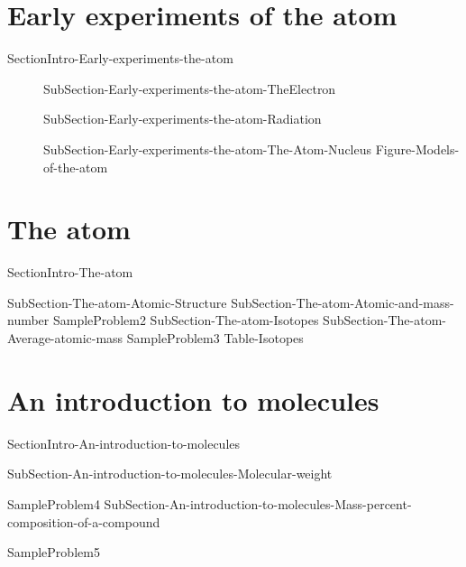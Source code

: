 \documentclass[main.tex]{subfiles}
\newcommand\chapterlabel{Ch-Table}\setcounter{figurenewcounter}{0}\setcounter{tablenewcounter}{0}\setcounter{formulanewcounter}{0}
\begin{document}
 \section{Early experiments of the atom}
{SectionIntro-Early-experiments-the-atom}
 \sloppy\begin{description}
\item[] {SubSection-Early-experiments-the-atom-TheElectron}
\item[] {SubSection-Early-experiments-the-atom-Radiation}
\item[] {SubSection-Early-experiments-the-atom-The-Atom-Nucleus}
 {Figure-Models-of-the-atom}

  \end{description}
 
\section{The atom}
{SectionIntro-The-atom}
\sloppy\begin{description}
{SubSection-The-atom-Atomic-Structure}
{SubSection-The-atom-Atomic-and-mass-number}
{SampleProblem2}
{SubSection-The-atom-Isotopes}
{SubSection-The-atom-Average-atomic-mass}
{SampleProblem3}
 {Table-Isotopes}
\end{description}
\section{An introduction to molecules}
{SectionIntro-An-introduction-to-molecules}
\sloppy
\begin{description}
{SubSection-An-introduction-to-molecules-Molecular-weight}
 
{SampleProblem4}
{SubSection-An-introduction-to-molecules-Mass-percent-composition-of-a-compound}
 
{SampleProblem5}
\end{description}
\end{document}
